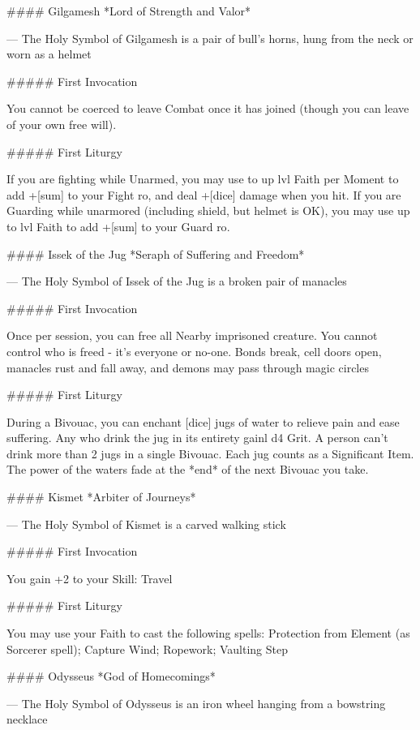 #### Gilgamesh
*Lord of Strength and Valor*

---
The Holy Symbol of Gilgamesh is a pair of bull's horns, hung from the neck or worn as a helmet

##### First Invocation

You cannot be coerced to leave Combat once it has joined (though you can leave of your own free will).

##### First Liturgy

If you are fighting while Unarmed, you may use to up {lvl} Faith per Moment to add +[sum] to your Fight {ro}, and deal +[dice] damage when you hit.  If you are Guarding while unarmored (including shield, but helmet is OK), you may use up to {lvl} Faith to add +[sum] to your Guard {ro}.





#### Issek of the Jug
*Seraph of Suffering and Freedom*

---
The Holy Symbol of Issek of the Jug is a broken pair of manacles

##### First Invocation

Once per session, you can free all Nearby imprisoned creature. You cannot control who is freed - it's everyone or no-one. Bonds break, cell doors open, manacles rust and fall away, and demons may pass through magic circles

##### First Liturgy

During a Bivouac, you can enchant [dice] jugs of water to relieve pain and ease suffering.  Any who drink the jug in its entirety gainl d4 Grit.  A person can't drink more than 2 jugs in a single Bivouac.  Each jug counts as a Significant Item.  The power of the waters fade at the *end* of the next Bivouac you take.




#### Kismet
*Arbiter of Journeys*

---
The Holy Symbol of Kismet is a carved walking stick

##### First Invocation

You gain +2 to your Skill: Travel

##### First Liturgy

You may use your Faith to cast the following spells: Protection from Element (as Sorcerer spell); Capture Wind; Ropework; Vaulting Step




#### Odysseus
*God of Homecomings*

---
The Holy Symbol of Odysseus is an iron wheel hanging from a bowstring necklace

